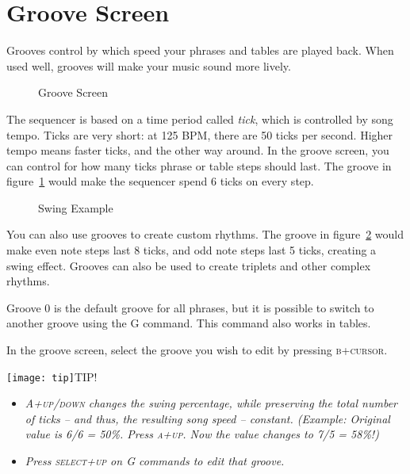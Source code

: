 \section{Groove Screen}

Grooves control by which speed your phrases and tables are played back. When used well, grooves will make your music sound more lively.

\begin{figure}[htbp]
	\begin{center}
	\end{center}
	\caption{Groove Screen}
	\label{fig:groove}
\end{figure}

The sequencer is based on a time period called \emph{tick}, which is controlled by song tempo.
Ticks are very short: at 125 BPM, there are 50 ticks per second.
Higher tempo means faster ticks, and the other way around. 
In the groove screen, you can control for how many ticks phrase or table steps should last.
The groove in figure~\ref{fig:groove} would make the sequencer spend 6 ticks on every step.

\begin{figure}[htbp]
	\begin{center}
	\end{center}
	\caption{Swing Example}
	\label{fig:groove-swing}
\end{figure}

You can also use grooves to create custom rhythms. The groove in figure~\ref{fig:groove-swing} would make even note steps last 8 ticks, and odd note steps last 5 ticks, creating a swing effect. Grooves can also be used to create triplets and other complex rhythms.

Groove 0 is the default groove for all phrases, but it is possible to switch to another groove using the G command.
This command also works in tables.

In the groove screen, select the groove you wish to edit by pressing \textsc{b+cursor}.

\texttt{[image: tip]}TIP!
\begin{itemize}
	\item \textit{ \textsc{A+up/down} changes the swing percentage, while preserving the total number of ticks -- and thus, the resulting song speed -- constant. (Example: Original value is 6/6 = 50\%. Press \textsc{a+up}. Now the value changes to 7/5 = 58\%!) }
    \item \textit{ Press \textsc{select+up} on G commands to edit that groove. }
\end{itemize}


